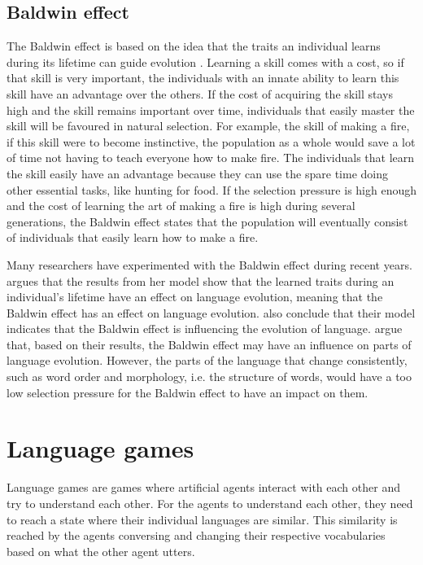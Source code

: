 \subsection{Baldwin effect}
The Baldwin effect is based on the idea that the traits an individual learns during its lifetime can guide evolution \citep{baldwin1896new}. Learning a skill comes with a cost, so if that skill is very important, the individuals with an innate ability to learn this skill have an advantage over the others. If the cost of acquiring the skill stays high and the skill remains important over time, individuals that easily master the skill will be favoured in natural selection. For example, the skill of making a fire, if this skill were to become instinctive, the population as a whole would save a lot of time not having to teach everyone how to make fire. The individuals that learn the skill easily have an advantage because they can use the spare time doing other essential tasks, like hunting for food. If the selection pressure is high enough and the cost of learning the art of making a fire is high during several generations, the Baldwin effect states that the population will eventually consist of individuals that easily learn how to make a fire.

Many researchers have experimented with the Baldwin effect during recent years. \citet{lipowska2011naming} argues that the results from her model show that the learned traits during an individual's lifetime have an effect on language evolution, meaning that the Baldwin effect has an effect on language evolution. \citet{zollman2010plasticity} also conclude that their model indicates that the Baldwin effect is influencing the evolution of language. \citet{chater2010language} argue that, based on their results, the Baldwin effect may have an influence on parts of language evolution. However, the parts of the language that change consistently, such as word order and morphology, i.e. the structure of words, would have a too low selection pressure for the Baldwin effect to have an impact on them.


\section{Language games}
Language games are games where artificial agents interact with each other and try to understand each other. For the agents to understand each other, they need to reach a state where their individual languages are similar. This similarity is reached by the agents conversing and changing their respective vocabularies based on what the other agent utters.

